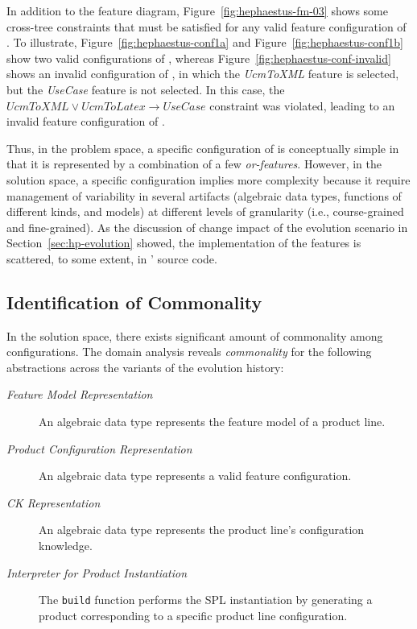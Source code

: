 
In addition to the feature diagram, Figure~\ref{fig:hephaestus-fm-03} shows some cross-tree constraints that must be satisfied for any valid feature configuration of \hpl.  To illustrate, Figure~\ref{fig:hephaestus-conf1a} and Figure~\ref{fig:hephaestus-conf1b} show two valid configurations of \hpl, whereas Figure~\ref{fig:hephaestus-conf-invalid} shows an invalid configuration of \hpl, in which the \emph{UcmToXML} feature is selected, but the \emph{UseCase} feature is not selected. In this case, the $UcmToXML \lor UcmToLatex \rightarrow Use Case$ constraint was violated, leading to an invalid feature configuration of \hpl.

Thus, in the problem space, a specific configuration of \hp{} is conceptually simple in that it is represented by a combination of a few \textit{or-features}. However, in the solution space, a specific configuration implies more complexity because it require management of variability in several artifacts (algebraic data types, functions of different kinds, and models) at different levels of granularity (i.e., course-grained and fine-grained). As the discussion of change impact of the evolution scenario in Section~\ref{sec:hp-evolution} showed, the implementation of the features is scattered, to some extent, in \hp' source code.


\subsection{Identification of Commonality} 
\label{sec:commonality}

In the solution space, there exists significant amount of commonality among configurations.  The domain analysis reveals \emph{commonality} for the following abstractions across the variants of the evolution history:

\begin{description}

\item[\emph{Feature Model Representation}] An algebraic data type represents the feature model of a product line.
  
\item[\emph{Product Configuration Representation}] An algebraic data type represents a valid feature configuration.

\item[\emph{CK Representation}] An algebraic data type represents the product line's configuration knowledge.

\item[\emph{Interpreter for Product Instantiation}] The \texttt{build} function performs the SPL instantiation by generating a product corresponding to a specific product line configuration.

\end{description}


